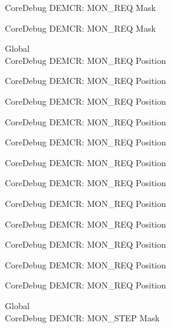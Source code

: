 \begin{DoxyRefList}
\label{deprecated__deprecated001177}%
%
Core\+Debug DEMCR\+: MON\+\_\+\+REQ Mask 

\label{deprecated__deprecated001279}%
%
Core\+Debug DEMCR\+: MON\+\_\+\+REQ Mask  
\item[Global \doxylink{group___c_m_s_i_s___core_debug_ga341020a3b7450416d72544eaf8e57a64}{Core\+Debug\+\_\+\+DEMCR\+\_\+\+MON\+\_\+\+REQ\+\_\+\+Pos} ]\hfill \\
\label{deprecated__deprecated000047}%
%
Core\+Debug DEMCR\+: MON\+\_\+\+REQ Position 

\label{deprecated__deprecated000191}%
%
Core\+Debug DEMCR\+: MON\+\_\+\+REQ Position 

\label{deprecated__deprecated000333}%
%
Core\+Debug DEMCR\+: MON\+\_\+\+REQ Position 

\label{deprecated__deprecated000409}%
%
Core\+Debug DEMCR\+: MON\+\_\+\+REQ Position 

\label{deprecated__deprecated000498}%
%
Core\+Debug DEMCR\+: MON\+\_\+\+REQ Position 

\label{deprecated__deprecated000600}%
%
Core\+Debug DEMCR\+: MON\+\_\+\+REQ Position 

\label{deprecated__deprecated000725}%
%
Core\+Debug DEMCR\+: MON\+\_\+\+REQ Position 

\label{deprecated__deprecated000869}%
%
Core\+Debug DEMCR\+: MON\+\_\+\+REQ Position 

\label{deprecated__deprecated001011}%
%
Core\+Debug DEMCR\+: MON\+\_\+\+REQ Position 

\label{deprecated__deprecated001087}%
%
Core\+Debug DEMCR\+: MON\+\_\+\+REQ Position 

\label{deprecated__deprecated001176}%
%
Core\+Debug DEMCR\+: MON\+\_\+\+REQ Position 

\label{deprecated__deprecated001278}%
%
Core\+Debug DEMCR\+: MON\+\_\+\+REQ Position  
\item[Global \doxylink{group___c_m_s_i_s___core_debug_ga2ded814556de96fc369de7ae9a7ceb98}{Core\+Debug\+\_\+\+DEMCR\+\_\+\+MON\+\_\+\+STEP\+\_\+\+Msk} ]\hfill \\
\label{deprecated__deprecated000050}%
%
Core\+Debug DEMCR\+: MON\+\_\+\+STEP Mask 


\end{DoxyRefList}
